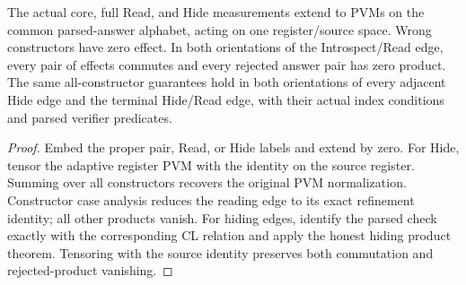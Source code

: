 \begin{lemma}
\label{lem:intro-honest-parsed}
\leanok
The actual core, full Read, and Hide measurements extend to PVMs on the common
parsed-answer alphabet, acting on one register/source space. Wrong constructors
have zero effect. In both orientations of the Introspect/Read edge, every
pair of effects commutes and every rejected answer pair has zero product.
The same all-constructor guarantees hold in both orientations of every
adjacent Hide edge and the terminal Hide/Read edge, with their actual index
conditions and parsed verifier predicates.
\end{lemma}
\begin{proof}
\leanok
Embed the proper pair, Read, or Hide labels and extend by zero. For Hide,
tensor the adaptive register PVM with the identity on the source register.
Summing over all constructors recovers the original PVM normalization.
Constructor case analysis reduces the reading edge to its exact refinement
identity; all other products vanish.
For hiding edges, identify the parsed check exactly with the corresponding
CL relation and apply the honest hiding product theorem. Tensoring with the
source identity preserves both commutation and rejected-product vanishing.
\end{proof}

